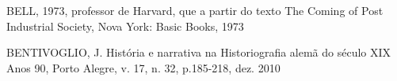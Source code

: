\documentclass[
12pt,		%
openright,	%
twoside,  %
a4paper,			%
chapter=TITLE,		%
english,			%
french,				%
spanish,			%
brazil				%
]{USPSC-classe/USPSC}
\begin{document}
\begin{flushleft}
\begin{flushleft}
\begin{flushleft}
\begin{flushleft}
\begin{flushleft}
\begin{flushleft}
\begin{flushleft}
\begin{flushleft}
\begin{flushleft}
[BELL, 1973]  BELL, 1973, professor de Harvard, que a partir do texto The Coming of Post Industrial Society, Nova York: Basic Books, 1973
\end{flushleft}


\end{flushleft}


\end{flushleft}


\end{flushleft}


\end{flushleft}


\end{flushleft}


\end{flushleft}


\end{flushleft}


\end{flushleft}


\begin{flushleft}
\begin{flushleft}
\begin{flushleft}
\begin{flushleft}
\begin{flushleft}
\begin{flushleft}
\begin{flushleft}
\begin{flushleft}
\begin{flushleft}
[BENTIVOGLIO, 2010] BENTIVOGLIO, J. Hist\'oria e narrativa na Historiografia alem\~a do s\'eculo XIX Anos 90, Porto Alegre, v. 17, n. 32, p.185-218, dez. 2010
\end{flushleft}


\end{flushleft}


\end{flushleft}


\end{flushleft}


\end{flushleft}


\end{flushleft}


\end{flushleft}


\end{flushleft}


\end{flushleft}
\end{document}
